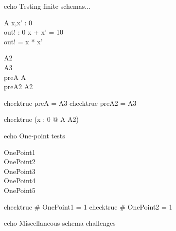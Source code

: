 %

echo Testing finite schemas...

\begin{schema}{A}
  x,x' : 0  \\
  out! : 0 
\where
  x + x' = 10 \\
  out! = x * x'
\end{schema}

\begin{zed}
  A2 
\\
  A3 
\\
  preA  \pre A
\\
  preA2  \pre A2
\end{zed}

checktrue preA = A3
checktrue preA2 = A3

checktrue (\forall x : 0  @ \pre A \iff A2)

echo One-point tests
\begin{zed}
  OnePoint1  \\
  OnePoint2  \\
  OnePoint3  \\
  OnePoint4  \\
  OnePoint5 
\end{zed}

checktrue \# OnePoint1 = 1
checktrue \# OnePoint2 = 1


echo Miscellaneous schema challenges


